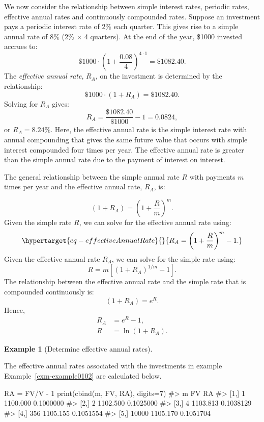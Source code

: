 \documentclass[
  letterpaper,
  DIV=11,
  numbers=noendperiod]{scrreprt}
\newenvironment{Shaded}{\begin{snugshade}}{\end{snugshade}}
\newcommand{\AttributeTok}[1]{\textcolor[rgb]{0.40,0.45,0.13}{#1}}
\newcommand{\CommentTok}[1]{\textcolor[rgb]{0.37,0.37,0.37}{#1}}
\newcommand{\DecValTok}[1]{\textcolor[rgb]{0.68,0.00,0.00}{#1}}
\newcommand{\FunctionTok}[1]{\textcolor[rgb]{0.28,0.35,0.67}{#1}}
\newcommand{\NormalTok}[1]{\textcolor[rgb]{0.00,0.23,0.31}{#1}}
\newcommand{\OtherTok}[1]{\textcolor[rgb]{0.00,0.23,0.31}{#1}}
\newcommand{\SpecialCharTok}[1]{\textcolor[rgb]{0.37,0.37,0.37}{#1}}
\theoremstyle{definition}
\theoremstyle{definition}
\newtheorem{example}{Example}[chapter]
\theoremstyle{remark}
\begin{document}
We now consider the relationship between simple interest rates, periodic
rates, effective annual rates and continuously compounded rates. Suppose
an investment pays a periodic interest rate of 2\% each quarter. This
gives rise to a simple annual rate of 8\% (2\% \(\times\) 4 quarters).
At the end of the year, \$1000 invested accrues to:
\[\$1000\cdot\left(1+\frac{0.08}{4}\right)^{4\cdot1}=\$1082.40.\] The
\emph{effective annual rate}, \(R_{A}\), on
the investment is determined by the relationship:
\[\$1000\cdot(1+R_{A})=\$1082.40.\] Solving for \(R_{A}\) gives:
\[R_{A}=\frac{\$1082.40}{\$1000}-1=0.0824,\] or \(R_{A}=8.24\%.\) Here,
the effective annual rate is the simple interest rate with annual
compounding that gives the same future value that occurs with simple
interest compounded four times per year. The effective annual rate is
greater than the simple annual rate due to the payment of interest on
interest.

The general relationship between the simple annual rate \(R\) with
payments \(m\) times per year and the effective annual rate, \(R_{A}\),
is:

\[(1+R_{A})=\left(1+\frac{R}{m}\right)^{m}.\] Given the simple rate
\(R\), we can solve for the effective annual rate using:
\begin{equation}\protect\hypertarget{eq-effectiveAnnualRate}{}{
R_{A}=\left(1+\frac{R}{m}\right)^{m}-1.
}\label{eq-effectiveAnnualRate}\end{equation} Given the effective annual
rate \(R_{A}\), we can solve for the simple rate using:
\[R=m\left[(1+R_{A})^{1/m}-1\right].\] The relationship between the
effective annual rate and the simple rate that is compounded
continuously is: \[(1+R_{A})=e^{R}.\] Hence, \begin{align*}
R_{A} & =e^{R}-1,\\
R & =\ln(1+R_{A}).
\end{align*}

\begin{example}[Determine effective annual
rates]\protect\hypertarget{exm-example0104}{}\label{exm-example0104}

The effective annual rates associated with the investments in example
Example~\ref{exm-example0102} are calculated below.

\end{example}

\begin{Shaded}
\begin{Highlighting}[]
\NormalTok{RA }\OtherTok{=}\NormalTok{ FV}\SpecialCharTok{/}\NormalTok{V }\SpecialCharTok{{-}} \DecValTok{1}  
\FunctionTok{print}\NormalTok{(}\FunctionTok{cbind}\NormalTok{(m, FV, RA), }\AttributeTok{digits=}\DecValTok{7}\NormalTok{)}
\CommentTok{\#\textgreater{}          m       FV        RA}
\CommentTok{\#\textgreater{} [1,]     1 1100.000 0.1000000}
\CommentTok{\#\textgreater{} [2,]     2 1102.500 0.1025000}
\CommentTok{\#\textgreater{} [3,]     4 1103.813 0.1038129}
\CommentTok{\#\textgreater{} [4,]   356 1105.155 0.1051554}
\CommentTok{\#\textgreater{} [5,] 10000 1105.170 0.1051704}
\end{Highlighting}
\end{Shaded}
\end{document}
